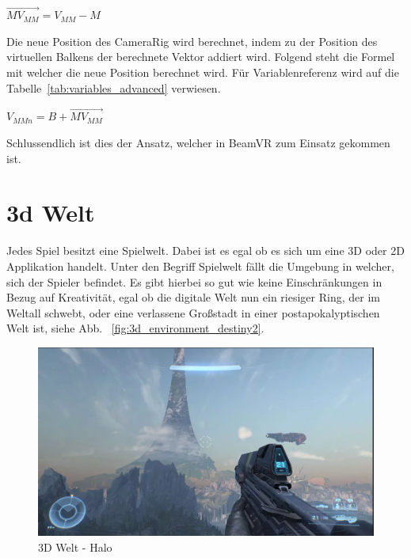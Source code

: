 $\vec{MV_{MM}} = V_{MM} - M$

Die neue Position des CameraRig wird berechnet, indem zu der Position des virtuellen Balkens der berechnete Vektor addiert wird.
Folgend steht die Formel mit welcher die neue Position berechnet wird.
Für Variablenreferenz wird auf die Tabelle~\ref{tab:variables_advanced} verwiesen.

$V_{MMn} = B + \vec{MV_{MM}}$

Schlussendlich ist dies der Ansatz, welcher in BeamVR zum Einsatz gekommen ist.

\section{3d Welt}\label{sec:3d-world}
Jedes Spiel besitzt eine Spielwelt.
Dabei ist es egal ob es sich um eine 3D oder 2D Applikation handelt.
Unter den Begriff Spielwelt fällt die Umgebung in welcher, sich der Spieler befindet.
Es gibt hierbei so gut wie keine Einschränkungen in Bezug auf Kreativität, egal ob die digitale Welt nun ein riesiger Ring, der im Weltall schwebt,
oder eine verlassene Großstadt in einer postapokalyptischen Welt ist, siehe Abb. ~\ref{fig:3d_environment_destiny2}.
~\cite{GamesRadar_HaloRing_2022}




\begin{figure}
    \centering
    \includegraphics[scale=0.4]{pics/3d_welt_halo_ring}
    \caption{3D Welt - Halo}
    \label{fig:3d_environment_halo}
\end{figure}




